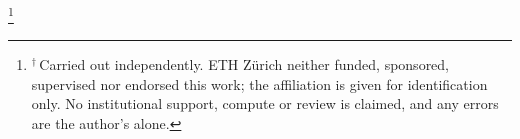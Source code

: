 \documentclass[10pt,twocolumn,letterpaper]{article}
\theoremstyle{definition}
\newcommand\blfootnote[1]{%
  \begingroup\renewcommand\thefootnote{}\footnote{#1}\addtocounter{footnote}{-1}\endgroup}
\begin{document}
\blfootnote{\hspace{-1.8em}$^\dagger$\,Carried out independently. ETH Z\"urich neither funded,
sponsored, supervised nor endorsed this work; the affiliation is given for identification only.
No institutional support, compute or review is claimed, and any errors are the author's alone.}













\small



\normalsize
\appendix
\onecolumn

\end{document}
